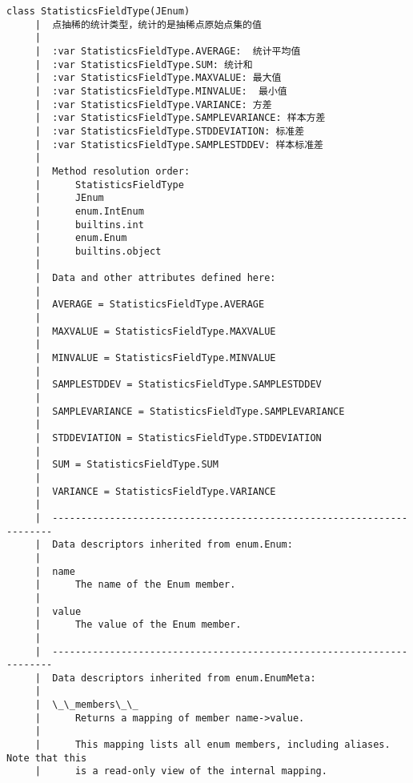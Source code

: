 \documentclass[11pt]{article}
\begin{document}
\begin{Verbatim}[commandchars=\\\{\}]
    class StatisticsFieldType(JEnum)
     |  点抽稀的统计类型，统计的是抽稀点原始点集的值
     |  
     |  :var StatisticsFieldType.AVERAGE:  统计平均值
     |  :var StatisticsFieldType.SUM: 统计和
     |  :var StatisticsFieldType.MAXVALUE: 最大值
     |  :var StatisticsFieldType.MINVALUE:  最小值
     |  :var StatisticsFieldType.VARIANCE: 方差
     |  :var StatisticsFieldType.SAMPLEVARIANCE: 样本方差
     |  :var StatisticsFieldType.STDDEVIATION: 标准差
     |  :var StatisticsFieldType.SAMPLESTDDEV: 样本标准差
     |  
     |  Method resolution order:
     |      StatisticsFieldType
     |      JEnum
     |      enum.IntEnum
     |      builtins.int
     |      enum.Enum
     |      builtins.object
     |  
     |  Data and other attributes defined here:
     |  
     |  AVERAGE = StatisticsFieldType.AVERAGE
     |  
     |  MAXVALUE = StatisticsFieldType.MAXVALUE
     |  
     |  MINVALUE = StatisticsFieldType.MINVALUE
     |  
     |  SAMPLESTDDEV = StatisticsFieldType.SAMPLESTDDEV
     |  
     |  SAMPLEVARIANCE = StatisticsFieldType.SAMPLEVARIANCE
     |  
     |  STDDEVIATION = StatisticsFieldType.STDDEVIATION
     |  
     |  SUM = StatisticsFieldType.SUM
     |  
     |  VARIANCE = StatisticsFieldType.VARIANCE
     |  
     |  ----------------------------------------------------------------------
     |  Data descriptors inherited from enum.Enum:
     |  
     |  name
     |      The name of the Enum member.
     |  
     |  value
     |      The value of the Enum member.
     |  
     |  ----------------------------------------------------------------------
     |  Data descriptors inherited from enum.EnumMeta:
     |  
     |  \_\_members\_\_
     |      Returns a mapping of member name->value.
     |      
     |      This mapping lists all enum members, including aliases. Note that this
     |      is a read-only view of the internal mapping.
    

\end{Verbatim}
\end{document}
